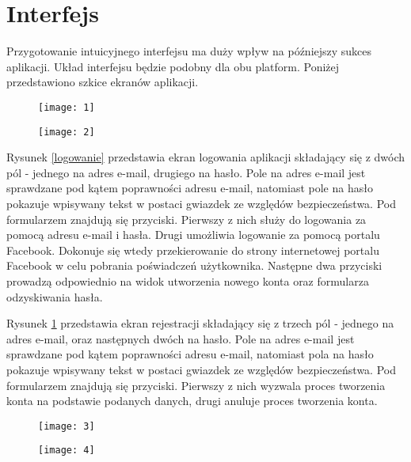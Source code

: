 \section{Interfejs}
Przygotowanie intuicyjnego interfejsu ma duży wpływ na późniejszy sukces aplikacji. Układ interfejsu będzie podobny dla obu platform. Poniżej przedstawiono szkice ekranów aplikacji.

\begin{figure}[h]
\centering
\begin{minipage}{.5\textwidth}
  \centering
  \texttt{[image: 1]}
  \label{logowanie}
\end{minipage}%
\begin{minipage}{.5\textwidth}
  \centering
  \texttt{[image: 2]}
  \label{rejestracja}
\end{minipage}
\end{figure}

Rysunek \ref{logowanie} przedstawia ekran logowania aplikacji składający się z dwóch pól - jednego na adres e-mail, drugiego na hasło. Pole na adres e-mail jest sprawdzane pod kątem poprawności adresu e-mail, natomiast pole na hasło pokazuje wpisywany tekst w postaci gwiazdek ze względów bezpieczeństwa. Pod formularzem znajdują się przyciski. Pierwszy z nich służy do logowania za pomocą adresu e-mail i hasła. Drugi umożliwia logowanie za pomocą portalu Facebook. Dokonuje się wtedy przekierowanie do strony internetowej portalu Facebook w celu pobrania poświadczeń użytkownika. Następne dwa przyciski prowadzą odpowiednio na widok utworzenia nowego konta oraz formularza odzyskiwania hasła.

Rysunek \ref{rejestracja} przedstawia ekran rejestracji składający się z trzech pól - jednego na adres e-mail, oraz następnych dwóch na hasło. Pole na adres e-mail jest sprawdzane pod kątem poprawności adresu e-mail, natomiast pola na hasło pokazuje wpisywany tekst w postaci gwiazdek ze względów bezpieczeństwa. Pod formularzem znajdują się przyciski. Pierwszy z nich wyzwala proces tworzenia konta na podstawie podanych danych, drugi anuluje proces tworzenia konta.

\begin{figure}[h]
\centering
\begin{minipage}{.55\textwidth}
  \centering
  \texttt{[image: 3]}
  \label{resetujhaslo}
\end{minipage}%
\begin{minipage}{.45\textwidth}
  \centering
  \texttt{[image: 4]}
  \label{dzisajrepertuar}
\end{minipage}
\end{figure}


